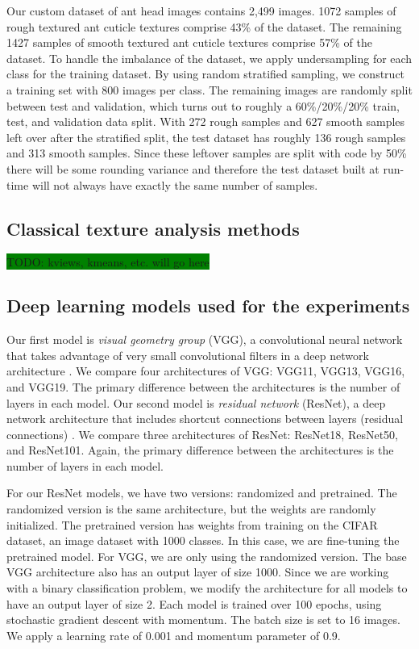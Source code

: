 \documentclass{aci}
\numberwithin{equation}{section}
\begin{document}
Our custom dataset of ant head images contains 2,499 images. 1072 samples of
rough textured ant cuticle textures comprise 43\% of the dataset. The remaining
1427 samples of smooth textured ant cuticle textures comprise 57\% of the
dataset. To handle the imbalance of the dataset, we apply undersampling for each
class for the training dataset. By using random stratified sampling, we
construct a training set with 800 images per class. The remaining images are
randomly split between test and validation, which turns out to roughly a
60\%/20\%/20\% train, test, and validation data split. With 272 rough samples
and 627 smooth samples left over after the stratified split, the test dataset
has roughly 136 rough samples and 313 smooth samples. Since these leftover
samples are split with code by 50\% there will be some rounding variance and
therefore the test dataset built at run-time will not always have exactly the
same number of samples.

\subsection{Classical texture analysis methods}

\colorbox{green}{TODO: kviews, kmeans, etc. will go here}

\subsection{Deep learning models used for the experiments}

Our first model is \textit{visual geometry group} (VGG), a convolutional neural
network that takes advantage of very small convolutional filters in a deep
network architecture \cite{simonyan_very_2015}. We compare four architectures of
VGG: VGG11, VGG13, VGG16, and VGG19. The primary difference between the
architectures is the number of layers in each model. Our second model is
\textit{residual network} (ResNet), a deep network architecture that includes
shortcut connections between layers (residual connections) \cite{he_deep_2015}.
We compare three architectures of ResNet: ResNet18, ResNet50, and ResNet101.
Again, the primary difference between the architectures is the number of layers
in each model.

For our ResNet models, we have two versions: randomized and pretrained. The
randomized version is the same architecture, but the weights are randomly
initialized. The pretrained version has weights from training on the CIFAR
dataset, an image dataset with 1000 classes. In this case, we are fine-tuning
the pretrained model. For VGG, we are only using the randomized version. The
base VGG architecture also has an output layer of size 1000. Since we are
working with a binary classification problem, we modify the architecture for all
models to have an output layer of size 2. Each model is trained over 100 epochs,
using stochastic gradient descent with momentum. The batch size is set to 16
images. We apply a learning rate of 0.001 and momentum parameter of 0.9.
\end{document}

